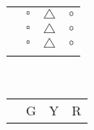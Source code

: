 \documentclass[11pt,twoside,a4paper]{article}
\begin{document}
\begin{multicols}{2}
\begin{tabular}{ p{} c c c}
		\hrulefill			&	{\color{green} $\square$ }	&	{\color{yellow} $\triangle$ }	&	{\color{red} $\circ$ }	\\
		\hrulefill			&	{\color{green} $\square$ }	&	{\color{yellow} $\triangle$ }	&	{\color{red} $\circ$ }	\\
		\hrulefill			&	{\color{green} $\square$ }	&	{\color{yellow} $\triangle$ }	&	{\color{red} $\circ$ }	\\
							&								&									&							\\
		
	\end{tabular}
		
		\vfill~\\ \columnbreak
	
	\begin{tabular}{ p{} c c c}
		
												&	{\color{green} G }	&	{\color{yellow} Y }	&	{\color{red} R }	\\
												

\end{tabular}
\end{multicols}
\end{document}
